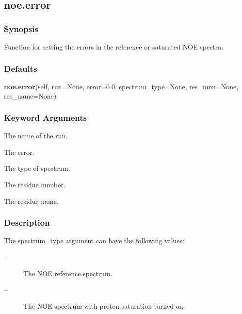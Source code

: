 




\newpage

\subsection{noe.error}


\subsubsection{Synopsis}

Function for setting the errors in the reference or saturated NOE spectra.

\subsubsection{Defaults}

\textsf{\textbf{noe.error}(self, run=None, error=0.0, spectrum\_type=None, res\_num=None, res\_name=None)}


\subsubsection{Keyword Arguments}


  The name of the run.

  The error.

  The type of spectrum.

  The residue number.

  The residue name.

\subsubsection{Description}

The spectrum\_type argument can have the following values:
\begin{description}
\item[    
 --]   The NOE reference spectrum.
\item[    
 --]   The NOE spectrum with proton saturation turned on.
\end{description}


